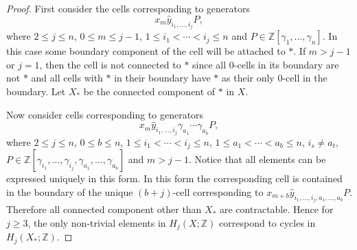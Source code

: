 \documentclass{article}
\theoremstyle{plain}
\theoremstyle{definition}
\numberwithin{thm}{section}
\begin{document}
\begin{proof}
					First consider the cells corresponding to generators
					\begin{equation*}
						x_m\hat{y}_{i_1,\dots,i_j}P,
					\end{equation*}
					where $2\leq j\leq n$, $0\leq m \leq j-1$, $1\leq i_1<\cdots<i_j\leq n$ and $P\in\mathbb{Z}[\gamma_1,\dots,\gamma_n]$.
					In this case some boundary component of the cell will be attached to $*$.
					If $m>j-1$ or $j=1$, then the cell is not connected to $*$ since all 0-cells in its boundary are not $*$
					and all cells with $*$ in their boundary have $*$ as their only 0-cell in the boundary.
					Let $X_*$ be the connected component of $*$ in $X$.
					
					Now consider cells corresponding to generators
					\begin{equation}\label{eq:StandarForm}
						x_m\hat{y}_{i_1,\dots,i_j}\gamma_{a_1}\cdots\gamma_{a_b}P,
					\end{equation}
					where $2\leq j \leq n$, $0 \leq b \leq n$, $1\leq i_1<\cdots<i_j\leq n$, $1\leq a_1<\cdots<a_b\leq n$, $i_s\neq a_t$,
					$P\in\mathbb{Z}[\gamma_{i_1},\dots,\gamma_{i_j},\gamma_{a_1},\dots,\gamma_{a_b}]$
					and $m>j-1$.
					Notice that all elements can be expressed uniquely in this form.
					In this form the corresponding cell is contained in the boundary of the unique $(b+j)$-cell corresponding to $x_{m+b}\hat{y}_{i_1,\dots,i_j,a_1,\dots,a_b}P$.
					Therefore all connected component other than $X_*$ are contractable.
					Hence for $j\geq3$, the only non-trivial elements in $H_j(X;\mathbb{Z})$ correspond to cycles in $H_j(X_*;\mathbb{Z})$.
					

\end{proof}
\end{document}
